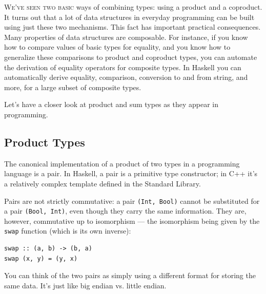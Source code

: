 \lettrine[lhang=0.17]{W}{e've seen two basic} ways of combining types: using a product and a
coproduct. It turns out that a lot of data structures in everyday
programming can be built using just these two mechanisms. This fact has
important practical consequences. Many properties of data structures are
composable. For instance, if you know how to compare values of basic
types for equality, and you know how to generalize these comparisons to
product and coproduct types, you can automate the derivation of equality
operators for composite types. In Haskell you can automatically derive
equality, comparison, conversion to and from string, and more, for a
large subset of composite types.

Let's have a closer look at product and sum types as they appear in
programming.

\subsection{Product Types}\label{product-types}

The canonical implementation of a product of two types in a programming
language is a pair. In Haskell, a pair is a primitive type constructor;
in C++ it's a relatively complex template defined in the Standard
Library.

\begin{figure}
  \centering
\end{figure}

\noindent
Pairs are not strictly commutative: a pair \texttt{(Int,\ Bool)} cannot
be substituted for a pair \texttt{(Bool,\ Int)}, even though they carry
the same information. They are, however, commutative up to isomorphism
--- the isomorphism being given by the \texttt{swap} function (which is
its own inverse):

\begin{verbatim}
swap :: (a, b) -> (b, a)
swap (x, y) = (y, x)
\end{verbatim}

\noindent
You can think of the two pairs as simply using a different format for
storing the same data. It's just like big endian vs. little endian.

